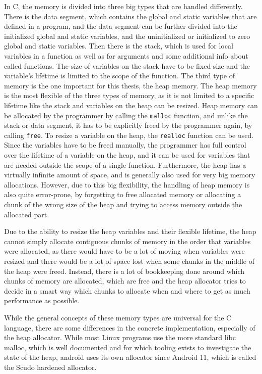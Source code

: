 \documentclass[a4paper,11pt,oneside]{report}
\begin{document}
In C, the memory is divided into three big types that are handled differently.
There is the data segment, which contains the global and static variables that
are defined in a program, and the data segment can be further divided into the
initialized global and static variables, and the uninitialized or initialized to
zero global and static variables.
Then there is the stack, which is used for local variables in a function as well
as for arguments and some additional info about called functions. The size of
variables on the stack have to be fixed-size and the variable's lifetime is
limited to the scope of the function.
The third type of memory is the one important for this thesis, the heap memory.
The heap memory is the most flexible of the three types of memory, as it is not
limited to a specific lifetime like the stack and variables on the heap can be
resized. Heap memory can be allocated by the programmer by calling the \verb|malloc|
function, and unlike the stack or data segment, it has to be explicitly freed by
the programmer again, by calling \verb|free|. To resize a variable on the heap, the
\verb|realloc| function can be used. Since the variables have to be freed manually,
the programmer has full control over the lifetime of a variable on the heap, and
it can be used for variables that are needed outside the scope of a single
function. Furthermore, the heap has a virtually infinite amount of space, and is
generally also used for very big memory allocations. However, due to this big
flexibility, the handling of heap memory is also quite error-prone, by forgetting
to free allocated memory or allocating a chunk of the wrong size of the heap and
trying to access memory outside the allocated part.

Due to the ability to resize the heap variables and their flexible lifetime, the
heap cannot simply allocate contiguous chunks of memory in the order that variables
were allocated, as there would have to be a lot of moving when variables were
resized and there would be a lot of space lost when some chunks in the middle of
the heap were freed. Instead, there is a lot of bookkeeping done around which
chunks of memory are allocated, which are free and the heap allocator tries to
decide in a smart way which chunks to allocate when and where to get as much
performance as possible.

While the general concepts of these memory types are universal for the C language,
there are some differences in the concrete implementation, especially of the heap
allocator. While most Linux programs use the more standard libc malloc, which is
well documented and for which tooling exists to investigate the state of the heap,
android uses its own allocator since Android 11, which is called the Scudo
hardened allocator.
\end{document}
